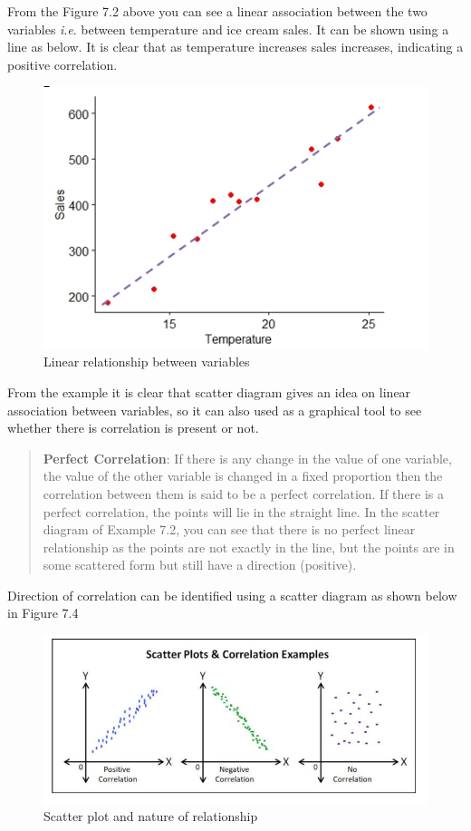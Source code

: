 \documentclass[
]{book}
\begin{document}
From the Figure 7.2 above you can see a linear association between the two variables \emph{i}.\emph{e}.
between temperature and ice cream sales. It can be shown using a line as
below. It is clear that as temperature increases sales increases,
indicating a positive correlation.

\begin{figure}

{\centering \includegraphics[width=0.5\linewidth]{images/image3.5c} 

}

\caption{Linear relationship between variables}\label{fig:c3}
\end{figure}

From the example it is clear that scatter diagram gives an idea on
linear association between variables, so it can also used as a graphical
tool to see whether there is correlation is present or not.

\begin{quote}
\textbf{Perfect Correlation}: If there is any change in the value of one
variable, the value of the other variable is changed in a fixed
proportion then the correlation between them is said to be a perfect
correlation. If there is a perfect correlation, the points will lie in
the straight line. In the scatter diagram of Example 7.2, you can see that
there is no perfect linear relationship as the points are not exactly in
the line, but the points are in some scattered form but still have a
direction (positive).
\end{quote}

Direction of correlation can be identified using a scatter diagram as shown below in Figure 7.4

\begin{figure}

{\centering \includegraphics[width=0.7\linewidth]{images/image4c} 

}

\caption{Scatter plot and nature of relationship}\label{fig:c4}
\end{figure}
\end{document}
